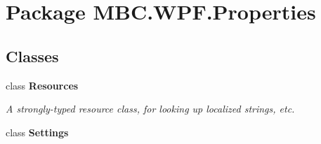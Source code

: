 \hypertarget{namespace_m_b_c_1_1_w_p_f_1_1_properties}{\section{Package M\-B\-C.\-W\-P\-F.\-Properties}
\label{namespace_m_b_c_1_1_w_p_f_1_1_properties}
}
\subsection*{Classes}
\begin{DoxyCompactItemize}
\item 
class {\bfseries Resources}
\begin{DoxyCompactList}\small\item\em A strongly-\/typed resource class, for looking up localized strings, etc. \end{DoxyCompactList}\item 
class {\bfseries Settings}
\end{DoxyCompactItemize}
